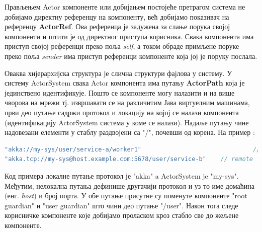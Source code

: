 \documentclass[12pt,oneside]{memoir}
\begin{document}
Прављењем Actor компоненте или добијањем постојеће претрагом система не добијамо директну референцу на компоненту, већ добијамо показивач на референцу \textbf{ActorRef}. Ова референца је задужена за слање порука својој компоненти и штити је од директног приступа корисника. Свака компонента има приступ својој референци преко поља \textit{self}, а током обраде примљене поруке преко поља \textit{sender} има приступ референци компоненте која јој је поруку послала.

Оваква хијерархијска структура је слична структури фајлова у систему. У систему ActorSystem свака Actor компонента има путању \textbf{ActorPath} која је јединствено идентификује. Пошто се компоненте могу налазити и на више чворова на мрежи тј. извршавати се на различитим Јава виртуелним машинама, први део путање садржи протокол и локацију на којој се налази компонента (идентификацију ActorSystem система у коме се налази). Надаље путању чине надовезани елементи у стаблу раздвојени са "/", почевши од корена. На пример \cite{akkaDoc}:
\begin{lstlisting}[language=Scala]
"akka://my-sys/user/service-a/worker1"                  		   	 // purely local
"akka.tcp://my-sys@host.example.com:5678/user/service-b" 	// remote
\end{lstlisting}
Код примера локалне путање протокол је "akka" a ActorSystem je "my-sys". Међутим, нелокална путања дефинише другачији протокол и уз то име домаћина (енг. \textit{host}) и број порта. У обе путање присутне су поменуте компоненте "root guardian" и "user guardian" што чини део путање "/user". Након тога следе корисничке компоненте које добијамо проласком кроз стабло све до жељене компоненте.
\end{document}
